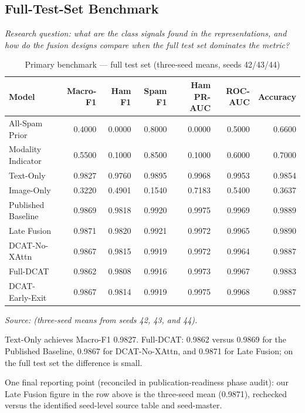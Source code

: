 \documentclass[10pt,twoside]{article}
\begin{document}
\subsection{Full-Test-Set Benchmark}\label{sec:7.1}

\emph{Research question: what are the class signals found in the representations, and how do the fusion designs compare when the full test set dominates the metric?}

\begin{table}[t]
\centering
\caption{Primary benchmark — full test set (three-seed means, seeds 42/43/44)}
\label{tab:benchmark}
\small
\setlength{\tabcolsep}{3.4pt}
\begin{tabular}{lrrrrrr}\toprule
Model & Macro-F1 & Ham F1 & Spam F1 & Ham PR-AUC & ROC-AUC & Accuracy \\
\midrule
All-Spam Prior & 0.4000 & 0.0000 & 0.8000 & 0.0000 & 0.5000 & 0.6600 \\
Modality Indicator & 0.5500 & 0.1000 & 0.8500 & 0.1000 & 0.6000 & 0.7000 \\
Text-Only & 0.9827 & 0.9760 & 0.9895 & 0.9968 & 0.9953 & 0.9854 \\
Image-Only & 0.3220 & 0.4901 & 0.1540 & 0.7183 & 0.5400 & 0.3637 \\
Published Baseline & 0.9869 & 0.9818 & 0.9920 & 0.9975 & 0.9969 & 0.9889 \\
Late Fusion & 0.9871 & 0.9820 & 0.9921 & 0.9972 & 0.9965 & 0.9890 \\
DCAT-No-XAttn & 0.9867 & 0.9815 & 0.9919 & 0.9972 & 0.9964 & 0.9887 \\
Full-DCAT & 0.9862 & 0.9808 & 0.9916 & 0.9973 & 0.9967 & 0.9883 \\
DCAT-Early-Exit & 0.9867 & 0.9814 & 0.9919 & 0.9975 & 0.9968 & 0.9887 \\
\bottomrule
\end{tabular}

{\footnotesize\itshape Source:  (three-seed means from seeds 42, 43, and 44).\par}

\end{table}

Text-Only achieves Macro-F1 0.9827. Full-DCAT: 0.9862 versus 0.9869 for the Published Baseline, 0.9867 for DCAT-No-XAttn, and 0.9871 for Late Fusion; on the full test set the difference is small.

One final reporting point (reconciled in publication-readiness phase audit): our Late Fusion figure in the row above is the three-seed mean (0.9871), rechecked versus the identified seed-level source table and seed-master.
\end{document}
